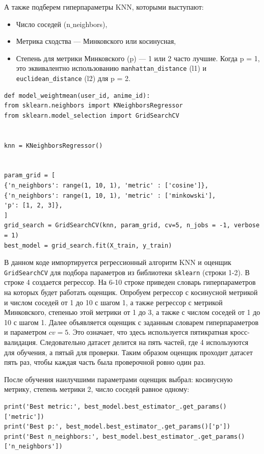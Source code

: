 \documentclass[bachelor, och, diploma]{SCWorks}
\begin{document}
А также подберем гиперпараметры KNN, которыми выступают:
\begin{itemize}
	\item Число соседей (n$\_$neighbors),
	\item Метрика сходства --- Минковского или косинусная,
	\item Степень для метрики Минковского (p) --- 1 или 2 часто лучшие. Когда p = 1, это эквивалентно использованию \verb|manhattan_distance| (l1) и \verb|euclidean_distance| (l2) для p = 2.
\end{itemize}

\begin{verbatim}
def model_weightmean(user_id, anime_id):
from sklearn.neighbors import KNeighborsRegressor
from sklearn.model_selection import GridSearchCV


knn = KNeighborsRegressor()


param_grid = [
{'n_neighbors': range(1, 10, 1), 'metric' : ['cosine']},
{'n_neighbors': range(1, 10, 1), 'metric' : ['minkowski'],
'p': [1, 2, 3]},
]
grid_search = GridSearchCV(knn, param_grid, cv=5, n_jobs = -1, verbose = 1)
best_model = grid_search.fit(X_train, y_train)

\end{verbatim}

В данном коде импортируется регрессионный алгоритм KNN и оценщик \verb|GridSearchCV| для подбора параметров из библиотеки \verb|sklearn| (строки 1-2). В строке 4 создается регрессор. На 6-10 строке приведен словарь гиперпараметров на которых будет работать оценщик. Опробуем регрессор
 с косинусной метрикой и числом соседей от 1 до 10 с шагом 1, а также регрессор с метрикой Минковского, степенью этой метрики от 1 до 3, а также с числом
  соседей от 1 до 10 с шагом 1. Далее объявляется оценщик с заданным словарем гиперпараметров и параметром $cv = 5$. Это означает, что здесь используется пятикратная кросс-валидация. Следовательно датасет делится на пять частей, где 4 используются для обучения, 
  а пятый для проверки. Таким образом оценщик проходит датасет пять раз, чтобы каждая часть была проверочной ровно один раз.

После обучения наилучшими параметрами оценщик выбрал: косинусную метрику, степень метрики 2, число соседей равное одному:

\begin{verbatim}
print('Best metric:', best_model.best_estimator_.get_params()['metric'])
print('Best p:', best_model.best_estimator_.get_params()['p'])
print('Best n_neighbors:', best_model.best_estimator_.get_params()['n_neighbors'])
\end{verbatim}
\end{document}
